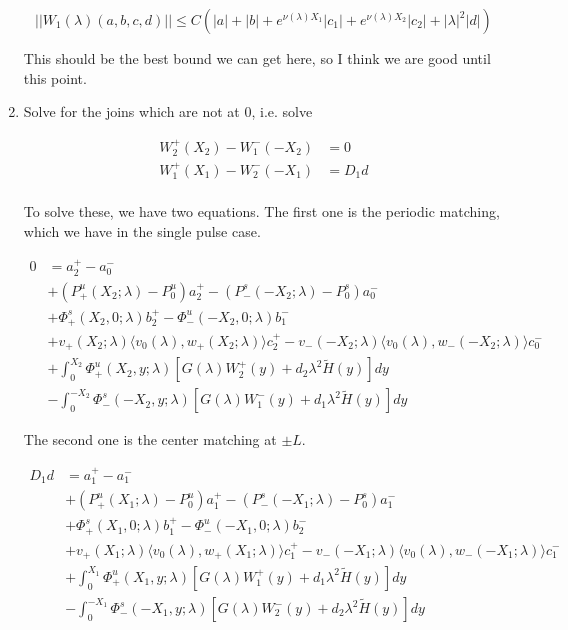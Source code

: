 \documentclass[12pt]{article}
\begin{document}
\begin{enumerate}
\[
||W_1(\lambda)(a,b,c,d)|| \leq C (|a| + |b| + e^{\nu(\lambda)X_1}|c_1| + e^{\nu(\lambda)X_2}|c_2| + |\lambda|^2 |d| )
\]

This should be the best bound we can get here, so I think we are good until this point.

\item Solve for the joins which are not at 0, i.e. solve

\begin{align*}
W_2^+(X_2) - W_1^-(-X_2) &= 0 \\
W_1^+(X_1) - W_2^-(-X_1) &= D_1 d \\
\end{align*}

To solve these, we have two equations. The first one is the periodic matching, which we have in the single pulse case.

\begin{align*}
0 &= a_2^+ - a_0^- \\
&+ (P^u_+(X_2; \lambda) - P_0^u)a_2^+ - (P^s_-(-X_2; \lambda) - P_0^s)a_0^- \\
&+ \Phi^s_+(X_2, 0; \lambda)b_2^+ - \Phi^u_-(-X_2, 0; \lambda)b_1^- \\
&+ v_+(X_2; \lambda) \langle v_0(\lambda), w_+(X_2; \lambda) \rangle c_2^+ - v_-(-X_2; \lambda) \langle v_0(\lambda), w_-(-X_2; \lambda) \rangle c_0^- \\
&+ \int_0^{X_2} \Phi^u_+(X_2, y; \lambda) [ G(\lambda)W_2^+(y) + d_2 \lambda^2 \tilde{H}(y) ] dy \\
&- \int_0^{-X_2} \Phi^s_-(-X_2, y; \lambda) [ G(\lambda)W_1^-(y) + d_1 \lambda^2 \tilde{H}(y) ] dy
\end{align*}

The second one is the center matching at $\pm L$.

\begin{align*}
D_1 d &= a_1^+ - a_1^- \\
&+ (P^u_+(X_1; \lambda) - P_0^u)a_1^+ - (P^s_-(-X_1; \lambda) - P_0^s)a_1^- \\
&+ \Phi^s_+(X_1, 0; \lambda)b_1^+ - \Phi^u_-(-X_1, 0; \lambda)b_2^- \\
&+ v_+(X_1; \lambda) \langle v_0(\lambda), w_+(X_1; \lambda) \rangle c_1^+ - v_-(-X_1; \lambda) \langle v_0(\lambda), w_-(-X_1; \lambda) \rangle c_1^- \\
&+ \int_0^{X_1} \Phi^u_+(X_1, y; \lambda) [ G(\lambda)W_1^+(y) + d_1 \lambda^2 \tilde{H}(y) ] dy \\
&- \int_0^{-X_1} \Phi^s_-(-X_1, y; \lambda) [ G(\lambda)W_2^-(y) + d_2 \lambda^2 \tilde{H}(y) ] dy
\end{align*}


\end{enumerate}
\end{document}

